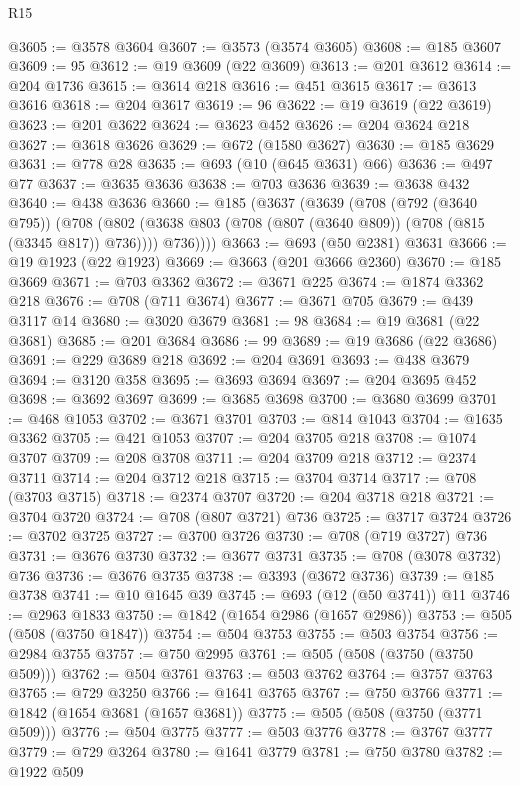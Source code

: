 \begin{lexlean}{R15}
\begin{coremodule}
{{{{{{{{{{{@3605 := @3578 @3604
@3607 := @3573 (@3574 @3605)
@3608 := @185 @3607
@3609 := 95
@3612 := @19 @3609 (@22 @3609)
@3613 := @201 @3612
@3614 := @204 @1736
@3615 := @3614 @218
@3616 := @451 @3615
@3617 := @3613 @3616
@3618 := @204 @3617
@3619 := 96
@3622 := @19 @3619 (@22 @3619)
@3623 := @201 @3622
@3624 := @3623 @452
@3626 := @204 @3624 @218
@3627 := @3618 @3626
@3629 := @672 (@1580 @3627)
@3630 := @185 @3629
@3631 := @778 @28
@3635 := @693 (@10 (@645 @3631) @66)
@3636 := @497 @77
@3637 := @3635 @3636
@3638 := @703 @3636
@3639 := @3638 @432
@3640 := @438 @3636
@3660 := @185
    (@3637
      (@3639
        (@708
          (@792 (@3640 @795))
          (@708
            (@802 (@3638 @803 (@708 (@807 (@3640 @809)) (@708 (@815 (@3345 @817)) @736))))
            @736))))
@3663 := @693 (@50 @2381) @3631
@3666 := @19 @1923 (@22 @1923)
@3669 := @3663 (@201 @3666 @2360)
@3670 := @185 @3669
@3671 := @703 @3362
@3672 := @3671 @225
@3674 := @1874 @3362 @218
@3676 := @708 (@711 @3674)
@3677 := @3671 @705
@3679 := @439 @3117 @14
@3680 := @3020 @3679
@3681 := 98
@3684 := @19 @3681 (@22 @3681)
@3685 := @201 @3684
@3686 := 99
@3689 := @19 @3686 (@22 @3686)
@3691 := @229 @3689 @218
@3692 := @204 @3691
@3693 := @438 @3679
@3694 := @3120 @358
@3695 := @3693 @3694
@3697 := @204 @3695 @452
@3698 := @3692 @3697
@3699 := @3685 @3698
@3700 := @3680 @3699
@3701 := @468 @1053
@3702 := @3671 @3701
@3703 := @814 @1043
@3704 := @1635 @3362
@3705 := @421 @1053
@3707 := @204 @3705 @218
@3708 := @1074 @3707
@3709 := @208 @3708
@3711 := @204 @3709 @218
@3712 := @2374 @3711
@3714 := @204 @3712 @218
@3715 := @3704 @3714
@3717 := @708 (@3703 @3715)
@3718 := @2374 @3707
@3720 := @204 @3718 @218
@3721 := @3704 @3720
@3724 := @708 (@807 @3721) @736
@3725 := @3717 @3724
@3726 := @3702 @3725
@3727 := @3700 @3726
@3730 := @708 (@719 @3727) @736
@3731 := @3676 @3730
@3732 := @3677 @3731
@3735 := @708 (@3078 @3732) @736
@3736 := @3676 @3735
@3738 := @3393 (@3672 @3736)
@3739 := @185 @3738
@3741 := @10 @1645 @39
@3745 := @693 (@12 (@50 @3741)) @11
@3746 := @2963 @1833
@3750 := @1842 (@1654 @2986 (@1657 @2986))
@3753 := @505 (@508 (@3750 @1847))
@3754 := @504 @3753
@3755 := @503 @3754
@3756 := @2984 @3755
@3757 := @750 @2995
@3761 := @505 (@508 (@3750 (@3750 @509)))
@3762 := @504 @3761
@3763 := @503 @3762
@3764 := @3757 @3763
@3765 := @729 @3250
@3766 := @1641 @3765
@3767 := @750 @3766
@3771 := @1842 (@1654 @3681 (@1657 @3681))
@3775 := @505 (@508 (@3750 (@3771 @509)))
@3776 := @504 @3775
@3777 := @503 @3776
@3778 := @3767 @3777
@3779 := @729 @3264
@3780 := @1641 @3779
@3781 := @750 @3780
@3782 := @1922 @509
}}}}}}}}}}}
\end{coremodule}
\end{lexlean}
